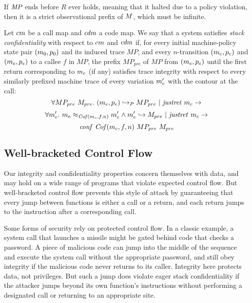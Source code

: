 \documentclass[acmsmall,review,anonymous]{acmart}\settopmatter{printfolios=true,printccs=false,printacmref=false}
\begin{document}
  If \(\mathit{MP}\) ends before \(R\) ever holds, meaning that it halted due to a
  policy violation, then it is a strict observational prefix of \(M\),
  which must be infinite.

Let $cm$ be a call map and $\mathit{cdm}$ a code map. We say that a
system satisfies {\em stack confidentiality} with respect to
$cm$ and $\mathit{cdm}$ if, for every initial machine-policy state
pair $(m_0, p_0)$ and its induced trace $MP$, and every
$n$-transition $(m_c, p_c)$ and $(m_e, p_e)$ to a callee
$f$ in $MP$, the prefix $MP_{pre}$ of $MP$ from $(m_e, p_e)$
until the first return corresponding to $m_c$ (if any) satisfies
trace integrity with respect to every similarly prefixed machine trace
of every variation $m_e'$ with the contour at the call:
$$\forall MP_{pre} ~ M_{pre}. ~
(m_e,p_e) \hookrightarrow_P MP_{pre} ~ | ~ \mathit{justret}\ m_c \rightarrow$$
$$\forall m_e'. ~ m_e \approx_{\mathit{Cof}(m_c, f, n)} m_e' \wedge
m_e' \hookrightarrow M_{pre} ~ | ~ \mathit{justret}\ m_c \rightarrow$$
$$\mathit{conf}~\mathit{Cof}(m_c, f, n) ~ MP_{pre} ~ M_{pre}$$

\subsection{Well-bracketed Control Flow}
\label{sec:wbcf}

Our integrity and confidentiality properties concern themselves with
data, and may hold on a wide range of programs that violate expected
control flow.  But well-bracketed control flow prevents this style of
attack by guaranteeing that every jump between functions is either a
call or a return, and each return jumps to the instruction after a
corresponding call.

    Some forms of security rely on protected control flow. In a classic
    example, a system call that launches a missile might be gated behind code
    that checks a password. A piece of malicious code can jump into the middle
    of the sequence and execute the system call without the appropriate password,
    and still obey integrity if the malicious code never returns to its caller.
    Integrity here protects data, not privileges. But such a jump does violate
    eager stack confidentiality if the attacker jumps beyond its own function's
    instructions without performing a designated call or returning to an
    appropriate site.
\end{document}
